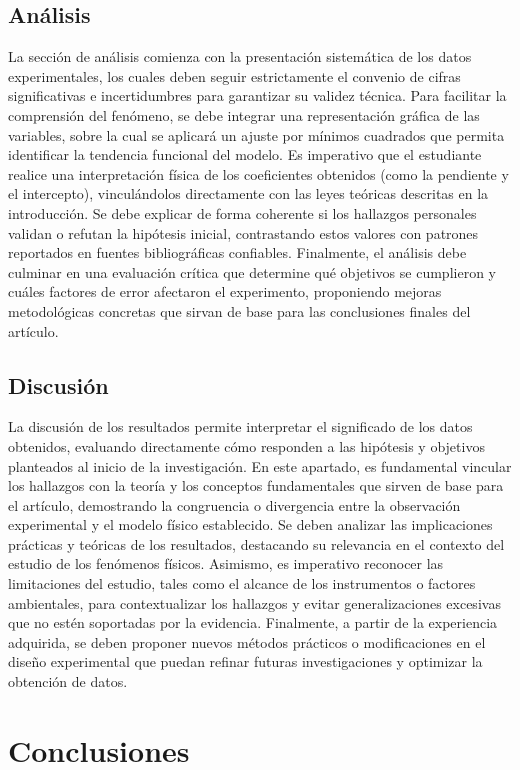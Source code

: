 \documentclass[conference]{IEEEtran}
\begin{document}
\subsection{Análisis}
La sección de análisis comienza con la presentación sistemática de los datos experimentales, los cuales deben seguir estrictamente el convenio de cifras significativas e incertidumbres para garantizar su validez técnica. Para facilitar la comprensión del fenómeno, se debe integrar una representación gráfica de las variables, sobre la cual se aplicará un ajuste por mínimos cuadrados que permita identificar la tendencia funcional del modelo. Es imperativo que el estudiante realice una interpretación física de los coeficientes obtenidos (como la pendiente y el intercepto), vinculándolos directamente con las leyes teóricas descritas en la introducción. Se debe explicar de forma coherente si los hallazgos personales validan o refutan la hipótesis inicial, contrastando estos valores con patrones reportados en fuentes bibliográficas confiables. Finalmente, el análisis debe culminar en una evaluación crítica que determine qué objetivos se cumplieron y cuáles factores de error afectaron el experimento, proponiendo mejoras metodológicas concretas que sirvan de base para las conclusiones finales del artículo.
\subsection{Discusión}
La discusión de los resultados permite interpretar el significado de los datos obtenidos, evaluando directamente cómo responden a las hipótesis y objetivos planteados al inicio de la investigación. En este apartado, es fundamental vincular los hallazgos con la teoría y los conceptos fundamentales que sirven de base para el artículo, demostrando la congruencia o divergencia entre la observación experimental y el modelo físico establecido. Se deben analizar las implicaciones prácticas y teóricas de los resultados, destacando su relevancia en el contexto del estudio de los fenómenos físicos. Asimismo, es imperativo reconocer las limitaciones del estudio, tales como el alcance de los instrumentos o factores ambientales, para contextualizar los hallazgos y evitar generalizaciones excesivas que no estén soportadas por la evidencia. Finalmente, a partir de la experiencia adquirida, se deben proponer nuevos métodos prácticos o modificaciones en el diseño experimental que puedan refinar futuras investigaciones y optimizar la obtención de datos.

\section{Conclusiones}
\end{document}
